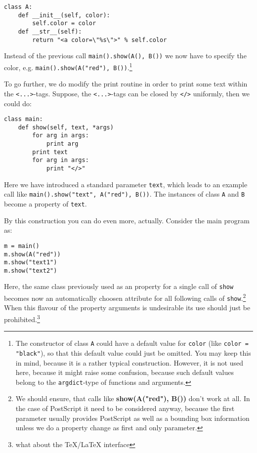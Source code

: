 \documentclass{article}
\begin{document}
\begin{verbatim}
class A:
    def __init__(self, color):
        self.color = color
    def __str__(self):
        return "<a color=\"%s\">" % self.color
\end{verbatim}

Instead of the previous call \verb|main().show(A(), B())| we now have
to specify the color, e.g.
\verb|main().show(A("red"), B())|.\footnote{The constructor of class
\texttt{A} could have a default value for \texttt{color} (like
\texttt{color = "black"}), so that this default value could just be
omitted. You may keep this in mind, because it is a rather typical
construction. However, it is not used here, because it might raise
some confusion, because such default values belong to the
\texttt{argdict}-type of functions and arguments.}

To go further, we do modify the print routine in order to print some
text within the \verb|<...>|-tags. Suppose, the \verb|<...>|-tags can
be closed by \verb|</>| uniformly, then we could do:

\begin{verbatim}
class main:
    def show(self, text, *args)
        for arg in args:
            print arg
        print text
        for arg in args:
            print "</>"
\end{verbatim}

Here we have introduced a standard parameter \verb|text|, which leads
to an example call like \verb|main().show("text", A("red"), B())|. The
instances of class \verb|A| and \verb|B| become a property of
\verb|text|.

By this construction you can do even more, actually.
Consider the main program as:

\begin{verbatim}
m = main()
m.show(A("red"))
m.show("text1")
m.show("text2")
\end{verbatim}

Here, the same class previously used as an property for a single
call of \verb|show| becomes now an automatically choosen attribute for
all following calls of \verb|show|.\footnote{We should ensure, that
calls like \textbf{show(A("red"), B())} don't work at all. In the case
of PostScript it need to be considered anyway, because the first
parameter usually provides PostScript as well as a bounding box
information unless we do a property change as first and only
parameter.} When this flavour of the property arguments is undesirable
its use should just be prohibited.\footnote{what about the \TeX/\LaTeX
interface}
\end{document}
